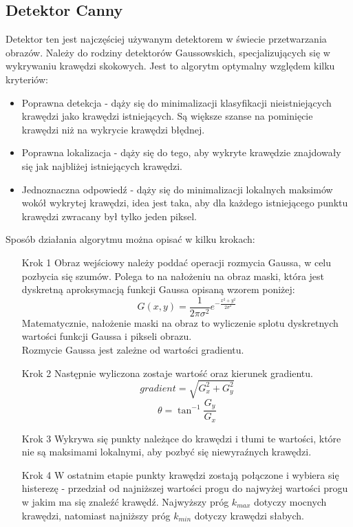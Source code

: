 \documentclass[eng,oneside]{mgr}
\begin{document}
\subsection{Detektor Canny}
\hspace{1cm} Detektor ten jest najczęściej używanym detektorem w świecie przetwarzania obrazów. Należy do rodziny detektorów Gaussowskich, specjalizujących się w wykrywaniu krawędzi skokowych. Jest to algorytm optymalny względem kilku kryteriów:
\begin{itemize}
\item Poprawna detekcja - dąży się do minimalizacji klasyfikacji nieistniejących krawędzi jako krawędzi istniejących. Są większe szanse na pominięcie krawędzi niż na wykrycie krawędzi błędnej.
\item Poprawna lokalizacja - dąży się do tego, aby wykryte krawędzie znajdowały się jak najbliżej istniejących krawędzi.
\item Jednoznaczna odpowiedź - dąży się do minimalizacji lokalnych maksimów wokół wykrytej krawędzi, idea jest taka, aby dla każdego istniejącego punktu krawędzi zwracany był tylko jeden piksel.
\end{itemize}
\hspace{1cm} Sposób działania algorytmu można opisać w kilku krokach:
\begin{itemize}
\item [Krok 1] Obraz wejściowy należy poddać operacji rozmycia Gaussa, w celu pozbycia się szumów. Polega to na nałożeniu na obraz maski, która jest dyskretną aproksymacją funkcji Gaussa opisaną wzorem poniżej:
\begin{equation}
G(x,y) = \frac{1}{2\pi\sigma^2}e^{-\frac{x^2+y^2}{2\sigma^2}}
\end{equation}
\hspace{1cm} Matematycznie, nałożenie maski na obraz to wyliczenie splotu dyskretnych wartości funkcji Gaussa i pikseli obrazu\cite{gauss}.\\
\hspace{1cm} Rozmycie Gaussa jest zależne od wartości gradientu.
\item [Krok 2] Następnie wyliczona zostaje wartość oraz kierunek gradientu. 
\begin{equation}
gradient = \sqrt{G_x^2 + G_y^2} 
\end{equation}
\begin{equation}
\theta = \tan ^{-1} \frac{G_y}{G_x}
\end{equation}
\item [Krok 3] Wykrywa się punkty należące do krawędzi i tłumi te wartości, które nie są maksimami lokalnymi, aby pozbyć się niewyraźnych krawędzi.
\item [Krok 4]  W ostatnim etapie punkty krawędzi zostają połączone i wybiera się histerezę - przedział od najniższej wartości progu do najwyżej wartości progu w jakim ma się znaleźć krawędź. Najwyższy próg $k_{max}$ dotyczy mocnych krawędzi, natomiast najniższy próg $k_{min}$ dotyczy krawędzi słabych.
\end{itemize}
\end{document}

